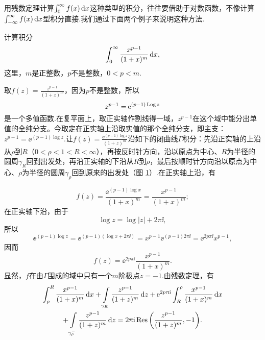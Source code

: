 用残数定理计算$\int_0^\infty f(x)\mathop{}\!\mathrm dx$这种类型的积分，往往要借助于对数函数，不像计算$\int_{-\infty}^\infty f(x)\mathop{}\!\mathrm dx$型积分直接.我们通过下面两个例子来说明这种方法.
\begin{example}\label{exam5.5.11}
  计算积分
  \[
    \int_0^\infty\frac{x^{p-1}}{(1+x)^m}\mathop{}\!\mathrm dx,
  \]
  这里，$m$是正整数，$p$不是整数，$0<p<m$.
\end{example}
\begin{solution}
  取$f(z)=\frac{z^{p-1}}{(1+z)^m}$，因为$p$不是整数，所以
  \[
    z^{p-1} = \operatorname{\!\!\;\mathrm e}^{(p-1)\operatorname{Log} z}
  \]
  是一个多值函数.在复平面上，取正实轴作割线得一域，$z^{p-1}$在这个域中能分出单值的全纯分支。今取定在正实轴上沿取实值的那个全纯分支，即主支：$z^{p-1}=\ee^{(p-1)\log z}$.让$f(z)=
  \frac{\ee^{(p-1)\log z}}{(1+z)^m}$沿如下的闭曲线$\Gamma$积分：先沿正实轴的上沿从$\rho$到$R$（$0<\rho<1<R<\infty$），再按反时针方向，沿以原点为中心、$R$为半径的圆周$\gamma_R$回到出发处，再沿正实轴的下沿从$R$到$\rho$，最后按顺时针方向沿以原点为中心、$\rho$为半径的圆周$\gamma_\rho$回到原来的出发处（图 \ref{fig5.4}）.在正实轴上沿，有
  \begin{figure}[!ht]
    \centering
    \caption{\label{fig5.4}}
  \end{figure}
  \[
    f(z) = \frac{\ee^{(p-1)\log x}}{(1+x)^m} = \frac{x^{p-1}}{(1+x)^m};
  \]
  在正实轴下沿，由于
  \[
    \log z = \log|z|+2\pi\ii,
  \]
  所以
  \[
    \ee^{(p-1)\log z} = \ee^{(p-1)(\log x+2\pi\ii)} = x^{p-1}\ee^{(p-1)2\pi\ii} = \ee^{2p\pi\ii}x^{p-1},
  \]
  因而
  \[
    f(z) = \ee^{2p\pi\ii}\frac{x^{p-1}}{(1+x)^m}.
  \]
  显然，$f$在由$\Gamma$围成的域中只有一个$m$阶极点$z=-1$.由残数定理，有
  \begin{equation}\label{eq5.5.7}
    \begin{gathered}
      \int_\rho^R\frac{x^{p-1}}{(1+x)^m}\dx+\int\limits_{\gamma_R}\frac{z^{p-1}}{(1+z)^m}\dz
      + \ee^{2p\pi\ii}\int_R^\rho\frac{x^{p-1}}{(1+x)^m}\dx\\
      + \int\limits_{\gamma_\rho^-}\frac{z^{p-1}}{(1+z)^m}\dz=
      2\pi\ii\Res\bigg(\frac{z^{p-1}}{(1+z)^m},-1\bigg).

\end{gathered}
\end{equation}
\end{solution}
